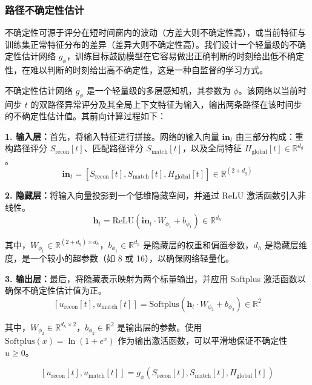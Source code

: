 \documentclass{setp-new}
\begin{document}
\subsubsection{路径不确定性估计}
不确定性可源于评分在短时间窗内的波动（方差大则不确定性高），或当前特征与训练集正常特征分布的差异（差异大则不确定性高）。我们设计一个轻量级的不确定性估计网络 $g_\phi$，训练目标鼓励模型在它容易做出正确判断的时刻给出低不确定性，在难以判断的时刻给出高不确定性，这是一种自监督的学习方式。


不确定性估计网络 $g_\phi$ 是一个轻量级的多层感知机，其参数为 $\phi$。该网络以当前时间步 $t$ 的双路径异常评分及其全局上下文特征为输入，输出两条路径在该时间步的不确定性估计值。其前向计算过程如下：


\textbf{1. 输入层：}首先，将输入特征进行拼接。网络的输入向量 $\mathbf{in}_t$ 由三部分构成：重构路径评分 $S_{\text{recon}}[t]$、匹配路径评分 $S_{\text{match}}[t]$，以及全局特征 $H_{\text{global}}[t] \in \mathbb{R}^{d_g}$。
\begin{equation}
\mathbf{in}_t = \left[ S_{\text{recon}}[t], S_{\text{match}}[t], H_{\text{global}}[t] \right] \in \mathbb{R}^{(2+d_g)} \tag{18a}
\end{equation}


\textbf{2. 隐藏层：}将输入向量投影到一个低维隐藏空间，并通过 ReLU 激活函数引入非线性。
\begin{equation}
\mathbf{h}_t = \text{ReLU}\left( \mathbf{in}_t \cdot W_{\phi_1} + b_{\phi_1} \right) \in \mathbb{R}^{d_h} \tag{18b}
\end{equation}


其中，$W_{\phi_1} \in \mathbb{R}^{(2+d_g) \times d_h}$，$b_{\phi_1} \in \mathbb{R}^{d_h}$ 是隐藏层的权重和偏置参数，$d_h$ 是隐藏层维度，是一个较小的超参数（如 8 或 16），以确保网络轻量化。


\textbf{3. 输出层：}最后，将隐藏表示映射为两个标量输出，并应用 Softplus 激活函数以确保不确定性估计值为正。
\begin{equation}
\left[ u_{\text{recon}}[t], u_{\text{match}}[t] \right] = \text{Softplus}\left( \mathbf{h}_t \cdot W_{\phi_2} + b_{\phi_2} \right) \in \mathbb{R}^2 \tag{18c}
\end{equation}


其中，$W_{\phi_2} \in \mathbb{R}^{d_h \times 2}$，$b_{\phi_2} \in \mathbb{R}^2$ 是输出层的参数。使用 $\text{Softplus}(x) = \ln(1 + e^x)$ 作为输出激活函数，可以平滑地保证不确定性 $u \geq 0$。


\begin{equation}
\left[ u_{\text{recon}}[t], u_{\text{match}}[t] \right] = g_\phi \left( S_{\text{recon}}[t], S_{\text{match}}[t], H_{\text{global}}[t] \right) \tag{18d}
\end{equation}
\end{document}
